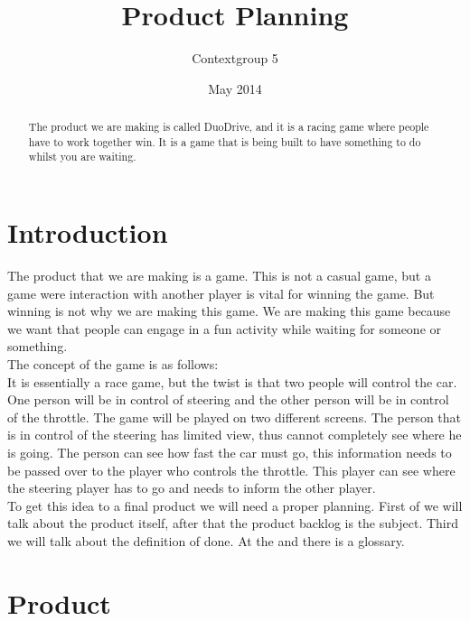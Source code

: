 \documentclass{article}
\title{Product Planning}
\author{Contextgroup 5}
\date{May 2014}
\begin{document}
\maketitle
\begin{abstract}
The product we are making is called DuoDrive, and it is a racing game where people have to work together win. It is a game that is being built to have something to do whilst you are waiting.
\end{abstract}
\section{Introduction}
The product that we are making is a game. This is not a casual game, but a game were interaction with another player is vital for winning the game. But winning is not why we are making this game. We are making this game because we want that people can engage in a fun activity while waiting for someone or something.\\
The concept of the game is as follows:\\
It is essentially a race game, but the twist is that two people will control the car. One person will be in control of steering and the other person will be in control of the throttle. The game will be played on two different screens. The person that is in control of the steering has limited view, thus cannot completely see where he is going. The person can see how fast the car must go, this information needs to be passed over to the player who controls the throttle. This player can see where the steering player has to go and needs to inform the other player.\\
To get this idea to a final product we will need a proper planning. First of we will talk about the product itself, after that the product backlog is the subject. Third we will talk about the definition of done. At the and there is a glossary.
\section{Product}
\end{document}
